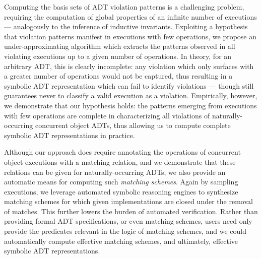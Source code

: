 Computing the basis sets of ADT violation patterns is a challenging problem,
requiring the computation of global properties of an infinite number of
executions — analogously to the inference of inductive invariants. Exploiting a
hypothesis that violation patterns manifest in executions with few operations,
we propose an under-approximating algorithm which extracts the patterns
observed in all violating executions up to a given number of operations. In
theory, for an arbitrary ADT, this is clearly incomplete: any violation which
only surfaces with a greater number of operations would not be captured, thus
resulting in a symbolic ADT representation which can fail to identify
violations — though still guarantees never to classify a valid execution as a
violation. Empirically, however, we demonstrate that our hypothesis holds: the
patterns emerging from executions with few operations are complete in
characterizing all violations of naturally-occurring concurrent object ADTs,
thus allowing us to compute complete symbolic ADT representations in practice.

Although our approach does require annotating the operations of concurrent
object executions with a matching relation, and we demonstrate that these
relations can be given for naturally-occurring ADTs, we also provide an
automatic means for computing such \emph{matching schemes}. Again by sampling
executions, we leverage automated symbolic reasoning engines to synthesize
matching schemes for which given implementations are closed under the removal
of matches. This further lowers the burden of automated verification. Rather
than providing formal ADT specifications, or even matching schemes, users need
only provide the predicates relevant in the logic of matching schemes, and we
could automatically compute effective matching schemes, and ultimately,
effective symbolic ADT representations.


